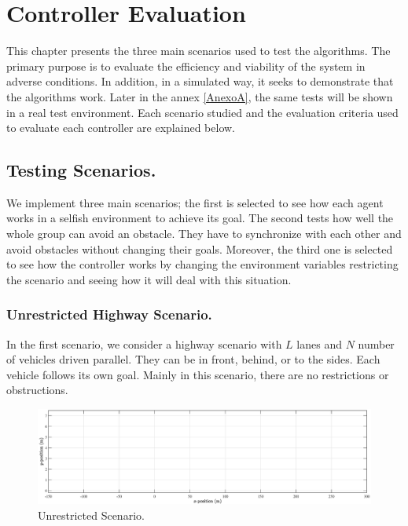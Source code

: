 \chapter{Controller Evaluation}
\label{chap:controller_evaluation}
This chapter presents the three main scenarios used to test the algorithms. The primary purpose is to evaluate the efficiency and viability of the system in adverse conditions. In addition, in a simulated way, it seeks to demonstrate that the algorithms work. Later in the annex \ref{AnexoA}, the same tests will be shown in a real test environment. Each scenario studied and the evaluation criteria used to evaluate each controller are explained below.


\section{Testing Scenarios. }


We implement three main scenarios; the first is selected to see how each agent works in a selfish environment to achieve its goal. The second tests how well the whole group can avoid an obstacle. They have to synchronize with each other and avoid obstacles without changing their goals. Moreover, the third one is selected to see how the controller works by changing the environment variables restricting the scenario and seeing how it will deal with this situation.

\subsection{ Unrestricted Highway Scenario.}


In the first scenario, we consider a highway scenario with $L$ lanes and $N$ number of vehicles driven parallel. They can be in front, behind, or to the sides. Each vehicle follows its own goal. Mainly in this scenario, there are no restrictions or obstructions.

\begin{figure}[H]
\centering
    \includegraphics[width=\textwidth]{Kap5/no_restricted_scenario.eps}
    \caption{Unrestricted Scenario.}

\end{figure}


